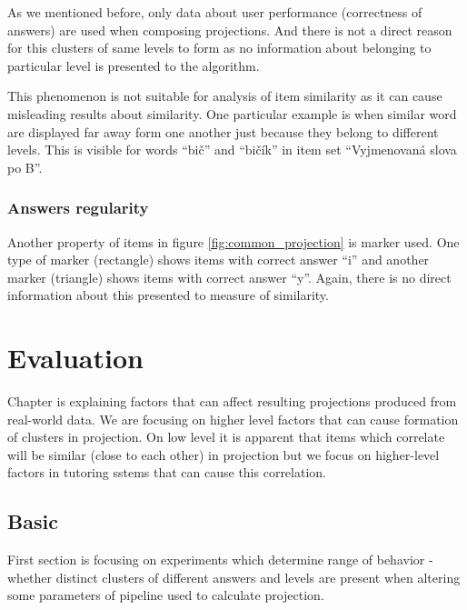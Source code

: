 \documentclass[
  digital, %
  table,   %
  nolof,     %
  nolot,     %
  nocover
]{fithesis3}
\begin{document}
As we mentioned before, only data about user performance (correctness of answers) are used when composing projections. And there is not a direct reason for this clusters of same levels to form as no information about belonging to particular level is presented to the algorithm.


This phenomenon is not suitable for analysis of item similarity as it can cause misleading results about similarity. One particular example is when similar word are displayed far away form one another just because they belong to different levels. This is visible for words ``bič'' and ``bičík'' in item set ``Vyjmenovaná slova po B''.

\subsection{Answers regularity}\label{answers-regularity}

Another property of items in figure \ref{fig:common_projection} is marker used. One type of marker (rectangle) shows items with correct answer ``i'' and another marker (triangle) shows items with correct answer ``y''. Again, there is no direct information about this presented to measure of similarity.


\chapter{Evaluation}


Chapter is explaining factors that can affect resulting projections produced from real-world data. We are focusing on higher level factors that can cause formation of clusters in projection. On low level it is apparent that items which correlate will be similar (close to each other) in projection but we focus on higher-level factors in tutoring sstems that can cause this correlation.

\section{Basic}

First section is focusing on experiments which determine range of behavior - whether distinct clusters of different answers and levels are present when altering some parameters of pipeline used to calculate projection.
\end{document}
